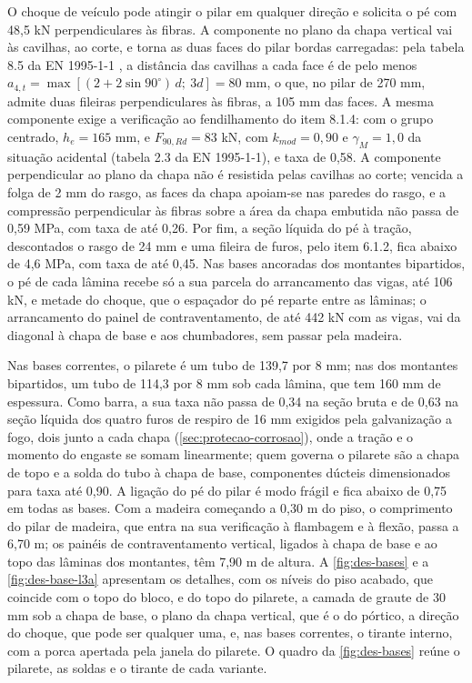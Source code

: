 O choque de veículo pode atingir o pilar em qualquer direção e solicita o pé
com 48,5 kN perpendiculares às fibras. A componente no plano da chapa vertical vai
às cavilhas, ao corte, e torna as duas faces do pilar bordas carregadas: pela
tabela 8.5 da EN 1995-1-1 \cite{EN1995-1-1:2004}, a distância das cavilhas a cada
face é de pelo menos $a_{4,t} = \max[(2 + 2\sin 90^{\circ})\,d;\ 3d] = 80$ mm, o que,
no pilar de 270 mm, admite duas fileiras perpendiculares às fibras, a 105 mm das
faces. A mesma componente exige a verificação ao fendilhamento do item 8.1.4: com o
grupo centrado, $h_e = 165$ mm, e $F_{90,Rd} = 83$ kN, com $k_{mod} = 0{,}90$ e
$\gamma_M = 1{,}0$ da situação acidental (tabela 2.3 da EN 1995-1-1), e taxa de
0,58. A componente perpendicular ao plano da chapa não é resistida pelas
cavilhas ao corte; vencida a folga de 2 mm do rasgo, as faces da chapa apoiam-se
nas paredes do rasgo, e a compressão perpendicular às fibras sobre a área da chapa
embutida não passa de 0,59 MPa, com taxa de até 0,26. Por fim, a seção líquida do
pé à tração, descontados o rasgo de 24 mm e uma fileira de furos, pelo item 6.1.2,
fica abaixo de 4,6 MPa, com taxa de até 0,45. Nas bases ancoradas dos montantes
bipartidos, o pé de cada lâmina recebe só a sua parcela do arrancamento das vigas,
até 106 kN, e metade do choque, que o espaçador do pé reparte entre as lâminas; o
arrancamento do painel de contraventamento, de até 442 kN com as vigas, vai da diagonal à
chapa de base e aos chumbadores, sem passar pela madeira.

Nas bases correntes, o pilarete é um tubo de 139,7 por 8 mm; nas dos montantes
bipartidos, um tubo de 114,3 por 8 mm sob cada lâmina, que tem 160 mm de
espessura. Como barra, a sua taxa
não passa de 0,34 na seção bruta e de 0,63 na seção líquida dos quatro furos de
respiro de 16 mm exigidos pela galvanização a fogo, dois junto a cada chapa
(\autoref{sec:protecao-corrosao}), onde a tração e o momento do engaste se somam
linearmente; quem governa o pilarete são a chapa de topo e a solda do tubo à
chapa de base, componentes dúcteis dimensionados para taxa até 0,90. A ligação
do pé do pilar é modo frágil e fica abaixo de 0,75 em todas as bases. Com a
madeira começando a 0,30 m do piso, o comprimento do pilar de madeira, que
entra na sua verificação à flambagem e à flexão, passa a 6,70 m; os painéis de
contraventamento vertical, ligados à chapa de base e ao topo das lâminas dos
montantes, têm 7,90 m de altura. A
\autoref{fig:des-bases} e a \autoref{fig:des-base-l3a} apresentam os detalhes,
com os níveis do piso acabado, que coincide com o topo do bloco, e do topo do
pilarete, a camada de graute de 30 mm sob a chapa de base, o plano da chapa
vertical, que é o do pórtico, a direção do choque, que pode ser qualquer uma, e,
nas bases correntes, o tirante interno, com a porca apertada pela janela do
pilarete. O quadro da \autoref{fig:des-bases} reúne o pilarete, as soldas e o
tirante de cada variante.


